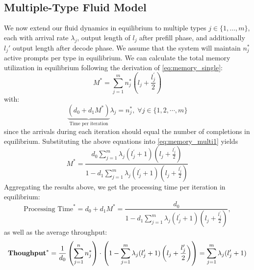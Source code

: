 \subsection{Multiple-Type Fluid Model}
We now extend our fluid dynamics in equilibrium to multiple types \(j \in \{1, \dots, m\}\), each with arrival rate \(\lambda_j\), output length of \(l_j\) after prefill phase, and additionally \(l_j'\) output length after decode phase. We assume that the system will maintain \(n_j^*\) active prompts per type in equilibrium. We can calculate the total memory utilization in equilibrium following the derivation of \eqref{eq:memory_single}:
\begin{equation}
\label{eq:memory_multi1}
    M^* = \sum_{j=1}^m n_j^*\left(l_j + \frac{l_j^\prime}{2}\right)
\end{equation}
with:
$$ \underset{\text{Time per iteration}}{\underbrace{(d_0+d_1M^*)}}\lambda_j = n_j^*, \;\forall j \in \{1,2,\cdots,m\}$$
since the arrivals during each iteration should equal the number of completions in equilibrium. Substituting the above equations into \eqref{eq:memory_multi1} yields
\begin{equation}
\label{eq:memory_multi2}
M^* = \frac{d_0\sum_{j=1}^m \lambda_j (l_j^{\prime}+1)\left(l_j + \frac{l_j^{\prime}}{2} \right)}{1-d_1\sum_{j=1}^m \lambda_j (l_j^{\prime}+1)\left(l_j + \frac{l_j^{\prime}}{2} \right) } 
\end{equation}
Aggregating the results above, we get the processing time per iteration in equilibrium:
\begin{equation}
\label{eq:time_fluid}
    \text{Processing Time}^* = d_0+d_1M^* = \frac{d_0}{1-d_1\sum_{j=1}^m \lambda_j (l_j^{\prime}+1)\left(l_j + \frac{l_j^{\prime}}{2} \right)},
\end{equation}
as well as the average throughput:
\begin{align}
    \textbf{Thoughput}^* = \frac{1}{d_0}\left(\sum_{j=1}^nn_j^*\right) \cdot \left(1- \sum_{j=1}^m \lambda_j (l_j^{\prime}+1)\left(l_j + \frac{l_j^{\prime}}{2} \right)\right) = \sum_{j=1}^m \lambda_j(l_j^{\prime}+1)\label{throughput_fluid_multiple}
\end{align}

